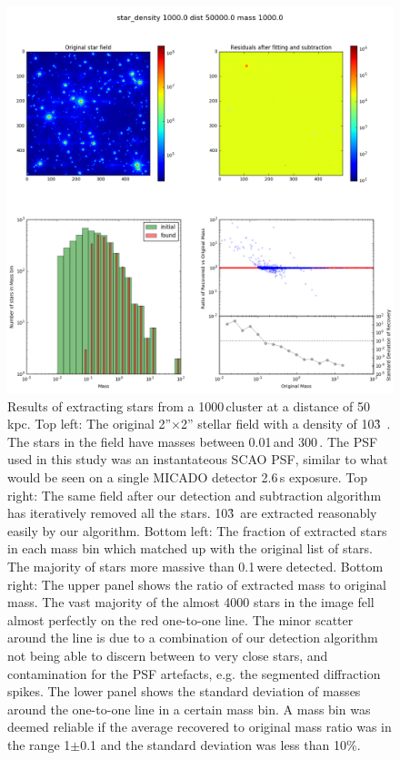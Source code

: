 \begin{figure}

    \centering
    \includegraphics[width=\textwidth]{images/results6_dist=50000_rho=1000}

    \caption{Results of extracting stars from a 1000\,\spa cluster at a distance of 50\,kpc. Top left: The original 2''$\times$2'' stellar field with a density of 10\h3~\spa. The stars in the field have masses between 0.01\,\msun and 300\,\msune. The PSF used in this study was an instantateous SCAO PSF, similar to what would be seen on a single MICADO detector 2.6\,s exposure. Top right: The same field after our detection and subtraction algorithm has iteratively removed all the stars. 10\h3~\spa are extracted reasonably easily by our algorithm. Bottom left: The fraction of extracted stars in each mass bin which matched up with the original list of stars. The majority of stars more massive than 0.1\,\msun were detected. Bottom right: The upper panel shows the ratio of extracted mass to original mass. The vast majority of the almost 4000 stars in the image fell almost perfectly on the red one-to-one line. The minor scatter around the line is due to a combination of our detection algorithm not being able to discern between to very close stars, and contamination for the PSF artefacts, e.g. the segmented diffraction spikes. The lower panel shows the standard deviation of masses around the one-to-one line in a certain mass bin. A mass bin was deemed reliable if the average recovered to original mass ratio was in the range 1$\pm$0.1 and the standard deviation was less than 10\%.}
    
    \label{fig:results_lmc_1E3}
    
\end{figure}


